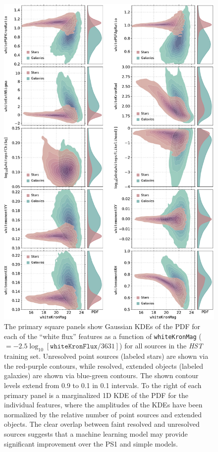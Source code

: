 \documentclass[twocolumn]{aastex62}
\begin{document}
\begin{CJK*}{UTF8}{gbsn}
\begin{figure}[htb]
 \centering
  \includegraphics[width=5.75in]{./Figures/whiteFeatures.pdf}
  \caption{
  The primary square panels show Gaussian KDEs of the PDF for each of the
  ``white flux'' features as a function of \texttt{whiteKronMag}
  ($=-2.5\log_{10}[\mathtt{whiteKronFlux}/3631]$) for all sources in the
  \textit{HST} training set. Unresolved point sources (labeled stars) are
  shown via the red-purple contours, while resolved, extended objects
  (labeled galaxies) are shown via blue-green contours. The shown contour
  levels extend from 0.9 to 0.1 in 0.1 intervals. To the right of each
  primary panel is a marginalized 1D KDE of the PDF for the individual
  features, where the amplitudes of the KDEs have been normalized by the
  relative number of point sources and extended objects. The clear overlap
  between faint resolved and unresolved sources suggests that a machine
  learning model may provide significant improvement over the PS1 and simple
  models.}
  \label{fig:features}
\end{figure}


\end{CJK*}
\end{document}
